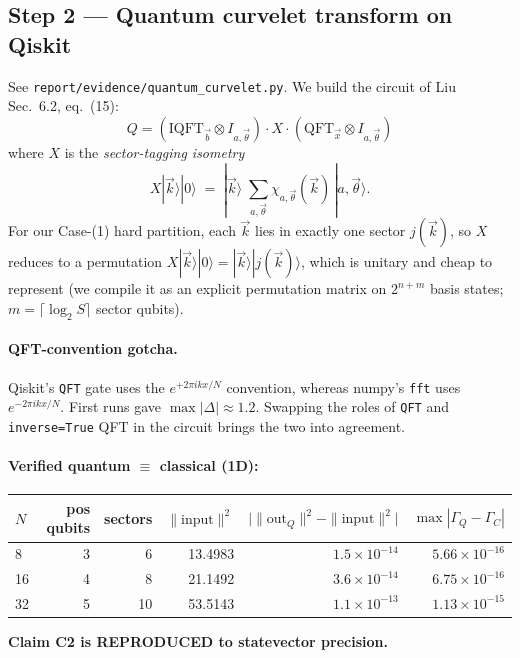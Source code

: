 \documentclass[11pt]{article}
\begin{document}
\subsection{Step 2 --- Quantum curvelet transform on Qiskit}
See \texttt{report/evidence/quantum\_curvelet.py}. We build the circuit of Liu Sec.~6.2, eq.~(15):
\begin{equation*}
  Q = (\text{IQFT}_{\vec b} \otimes I_{a,\vec\theta})
      \cdot X
      \cdot (\text{QFT}_{\vec x} \otimes I_{a,\vec\theta})
\end{equation*}
where $X$ is the \emph{sector-tagging isometry}
\[
  X|\vec k\rangle |0\rangle \;=\; |\vec k\rangle \; \sum_{a,\vec\theta} \chi_{a,\vec\theta}(\vec k) \, |a,\vec\theta\rangle .
\]
For our Case-(1) hard partition, each $\vec k$ lies in exactly one sector $j(\vec k)$, so $X$ reduces to a permutation
$X|\vec k\rangle |0\rangle = |\vec k\rangle |j(\vec k)\rangle$, which is unitary and cheap to represent (we compile it as an explicit permutation matrix on $2^{n+m}$ basis states; $m = \lceil \log_2 S \rceil$ sector qubits).

\paragraph{QFT-convention gotcha.} Qiskit's \texttt{QFT} gate uses the $e^{+2\pi i k x / N}$ convention, whereas numpy's \texttt{fft} uses $e^{-2\pi i k x / N}$. First runs gave $\max|\Delta| \approx 1.2$. Swapping the roles of \texttt{QFT} and \texttt{inverse=True} QFT in the circuit brings the two into agreement.

\paragraph{Verified quantum $\equiv$ classical (1D):}
\begin{center}
\begin{tabular}{lrrrrr}
\toprule
$N$ & pos qubits & sectors & $\|\text{input}\|^2$ & $\big|\|\text{out}_Q\|^2 - \|\text{input}\|^2\big|$ & $\max|\Gamma_Q - \Gamma_C|$ \\
\midrule
8  & 3 & 6  & 13.4983 & $1.5\times 10^{-14}$ & $5.66\times 10^{-16}$ \\
16 & 4 & 8  & 21.1492 & $3.6\times 10^{-14}$ & $6.75\times 10^{-16}$ \\
32 & 5 & 10 & 53.5143 & $1.1\times 10^{-13}$ & $1.13\times 10^{-15}$ \\
\bottomrule
\end{tabular}
\end{center}
\textbf{Claim C2 is REPRODUCED to statevector precision.}
\end{document}
